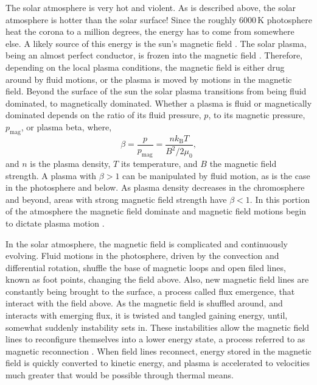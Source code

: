  
The solar atmosphere is very hot and violent.
As is described above, the solar atmosphere is hotter than the solar surface!
Since the roughly 6000\,K photosphere  heat the corona to a million degrees, the energy has to come from somewhere else. 
A likely source of this energy is the sun's magnetic field \citep{Priest2014}.
The solar plasma, being an almost perfect conductor, is frozen into the magnetic field \citep{Priest2014}.
Therefore, depending on the local plasma conditions, the magnetic field is either drug around by fluid motions, or the plasma is moved by motions in the magnetic field.
Beyond the surface of the sun the solar plasma transitions from being fluid dominated, to magnetically dominated.
Whether a plasma is fluid or magnetically dominated depends on the ratio of its fluid pressure, $p$, to its magnetic pressure, $p_\text{mag}$, or plasma beta, where,
\begin{equation}
	\beta = \frac{p}{p_\text{mag}} = \frac{nk_\text{B}T}{B^2 / 2\mu_0},
\end{equation}
and $n$ is the plasma density, $T$ its temperature, and $B$ the magnetic field strength.
A plasma with $\beta>1$ can be manipulated by fluid motion, as is the case in the photosphere and below.
As plasma density decreases in the chromosphere and beyond, areas with strong magnetic field strength have $\beta<1$.  
In this portion of the atmosphere the magnetic field dominate and magnetic field motions begin to dictate plasma motion \citep{Priest2014}.

In the solar atmosphere, the magnetic field is complicated and continuously evolving.
Fluid motions in the photosphere, driven by the convection and differential rotation, shuffle the base of magnetic loops and open filed lines, known as foot points, changing the field above.
Also, new magnetic field lines are constantly being brought to the surface, a process called flux emergence, that interact with the field above.
As the magnetic field is shuffled around, and interacts with emerging flux, it is twisted and tangled gaining energy, until, somewhat suddenly instability sets in.
These instabilities allow the magnetic field lines to reconfigure themselves into a lower energy state, a process referred to as magnetic reconnection \citep{Parker1957,Petschek1964}.
When field lines reconnect, energy stored in the magnetic field is quickly converted to kinetic energy, and plasma is accelerated to velocities much greater that would be possible through thermal means.

